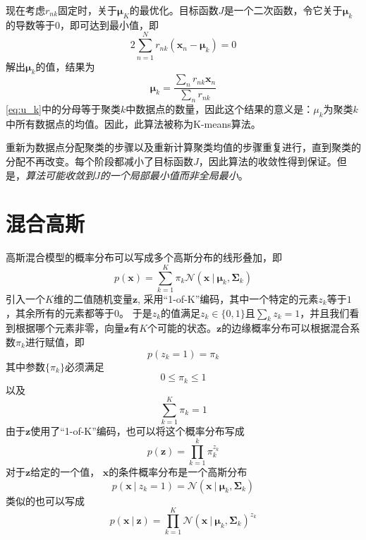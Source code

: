 \documentclass[11pt]{ctexbook}
\begin{document}
现在考虑$r_{nk}$固定时，关于$\bm \mu_K$的最优化。目标函数$J$是一个二次函数，令它关于$\bm \mu_k$的导数等于$0$，即可达到最小值，即
\begin{equation}
	2\sum_{n=1}^{N}r_{nk}(\bm x_n - \bm \mu_k) = 0
\end{equation}
解出$\bm \mu_k$的值，结果为
\begin{equation}
	\label{eq:u_k}
	\bm \mu_k = \frac{\sum_n r_{nk}\bm x_n}{\sum_n r_{nk}}
\end{equation}
\ref{eq:u_k}中的分母等于聚类$k$中数据点的数量，因此这个结果的意义是：$\mu_k$为聚类$k$中所有数据点的均值。因此，此算法被称为K-means算法。

重新为数据点分配聚类的步骤以及重新计算聚类均值的步骤重复进行，直到聚类的分配不再改变。每个阶段都减小了目标函数$J$，因此算法的收敛性得到保证。但是，\emph{算法可能收敛到$J$的一个局部最小值而非全局最小}。

\section{混合高斯}
高斯混合模型的概率分布可以写成多个高斯分布的线形叠加，即
\begin{equation}
	p(\bm x) = \sum_{k=1}^{K}\pi_k\mathcal N(\bm x\ | \ \bm \mu_k, \bm \Sigma_k)
\end{equation}
引入一个$K$维的二值随机变量$\bm z$, 采用“1-of-K”编码，其中一个特定的元素$z_k$等于$1$，其余所有的元素都等于$0$。 于是$z_k$的值满足$z_k \in \{0, 1\}$且$\sum_k z_k = 1$，并且我们看到根据哪个元素非零，向量$\bm z$有$K$个可能的状态。$\bm z$的边缘概率分布可以根据混合系数$\pi_k$进行赋值，即
\begin{equation}
	p(z_k=1) = \pi_k
\end{equation}
其中参数$\{\pi_k\}$必须满足
\begin{equation}
	0 \leqslant \pi_k \leqslant 1
\end{equation}
以及
\begin{equation}
	\sum_{k=1}^{K} \pi_k = 1
\end{equation}
由于$\bm z$使用了“1-of-K”编码，也可以将这个概率分布写成
\begin{equation}
	p(\bm z) = \prod_{k=1}^{k}\pi_k^{z_k}
\end{equation}
对于$\bm z$给定的一个值， $\bm x$的条件概率分布是一个高斯分布
\begin{equation}
	p(\bm x\ |\  z_k= 1) = \mathcal N (\bm x\ |\ \bm \mu_k, \bm \Sigma_k )
\end{equation}
类似的也可以写成
\begin{equation}
	p(\bm x \ | \ \bm z) = \prod_{k=1}^{K} \mathcal N (\bm x \ |\ \bm \mu_k, \bm \Sigma_k ) ^ {z_k}
\end{equation}
\end{document}
